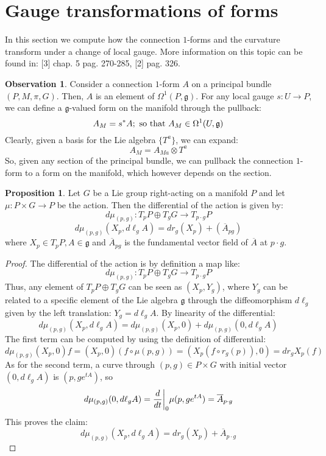 \documentclass[12pt,a4paper]{report}
\theoremstyle{definition}
\theoremstyle{Theorem}
\newtheorem{Prop}[Def]{Proposition}
\theoremstyle{definition}
\theoremstyle{definition}
\newtheorem{Obs}[Def]{Observation}
\begin{document}
	\section{Gauge transformations of forms}
	In this section we compute how the connection $1$-forms and the curvature transform under a change of local gauge. More information on this topic can be found in: [3] chap. 5 pag. 270-285, [2] pag. 326.
	\begin{Obs}
		Consider a connection $1$-form $A$ on a principal bundle $(P,M,\pi,G)$. Then, $A$ is an element of $\Omega^1(P,\mathfrak{g})$. For any local gauge $s:U\rightarrow P$, we can define a $\mathfrak{g}$-valued form on the manifold through the pullback:
		$$A_M=s^*A;\hbox{ so that }A_M\in \Omega^1(U,\mathfrak{g})$$
		Clearly, given a basis for the Lie algebra $\{T^a\}$, we can expand:
		$$A_M=A_{Ma}\otimes T^a$$
		So, given any section of the principal bundle, we can pullback the connection $1$-form to a form on the manifold, which however depends on the section.
	\end{Obs}
	\begin{Prop}\label{Prop_7.2.1}
		Let $G$ be a Lie group right-acting on a manifold $P$ and let $\mu:P\times G\rightarrow P$ be the action. Then the differential of the action is given by:
		$$d\mu_{(p,g)}:T_pP\oplus T_gG\rightarrow T_{p\cdot g}P$$
		$$d\mu_{(p,g)}(X_p,d\ell_gA)=dr_g(X_p)+(\overline{A}_{pg})$$
		where $X_p\in T_pP,A\in\mathfrak{g}$ and $\overline{A}_{pg}$ is the fundamental vector field of $\overline{A}$ at $p\cdot g$.
	\end{Prop}
	\begin{proof}
		The differential of the action is by definition a map like:
		$$d\mu_{(p,g)}:T_pP\oplus T_gG\rightarrow T_{p\cdot g}P$$
		Thus, any element of $T_pP\oplus T_gG$ can be seen as $(X_p,Y_g)$, where $Y_g$ can be related to a specific element of the Lie algebra $\mathfrak{g}$ through the diffeomorphism $d\ell_g$ given by the left translation: $Y_g=d\ell_gA$.
		By linearity of the differential:
		$$d\mu_{(p,g)}(X_p,d\ell_gA)=d\mu_{(p,g)}(X_p,0)+d\mu_{(p,g)}(0,d\ell_gA)$$
		The first term can be computed by using the definition of differential:
		$$d\mu_{(p,g)}(X_p,0)f=(X_p,0)(f\circ \mu(p,g))=(X_p(f\circ r_g(p)),0)=dr_gX_p(f)$$
		As for the second term, a curve through $(p,g)\in P\times G$ with initial vector $(0,d\ell_g A)$ is $(p,ge^{tA})$, so
		$$d\mu_{(p,g)}(0,d\ell_gA)={d\over dt}\bigg|_0\mu(p,ge^{tA})=\overline{A}_{p\cdot g}$$
		This proves the claim:
		$$d\mu_{(p,g)}(X_p,d\ell_gA)=dr_g(X_p)+\overline{A}_{p\cdot g}$$%
	\end{proof}
\end{document}
